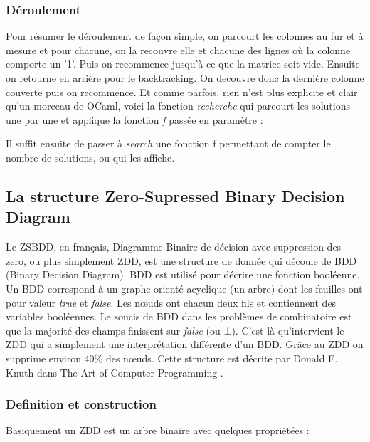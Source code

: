 \documentclass[a4paper]{article}
\begin{document}
\subsubsection{Déroulement}

Pour résumer le déroulement de façon simple, on parcourt les colonnes au fur et
à mesure et pour chacune, on la recouvre elle et chacune 
des lignes 
où la colonne comporte un '1'. Puis on recommence jusqu'à ce que la matrice 
soit vide. Ensuite on retourne en arrière pour le backtracking. On decouvre 
donc la dernière colonne couverte puis on recommence. Et comme parfois, rien n'est plus explicite et clair qu'un morceau de OCaml, 
voici la fonction \emph{recherche} qui parcourt les solutions une par une et 
applique la fonction \emph{f} passée en paramètre :




Il suffit ensuite de passer à \emph{search} une fonction f permettant de
compter le nombre de solutions, ou qui les affiche.

\subsection{La structure Zero-Supressed Binary Decision Diagram}



Le ZSBDD, en français, Diagramme Binaire de décision avec suppression des zero, 
ou plus simplement ZDD, est une structure de donnée qui découle de BDD (Binary 
Decision Diagram). BDD est utilisé pour décrire une fonction booléenne. Un
BDD correspond à un graphe orienté acyclique (un arbre) dont les feuilles ont 
pour valeur
\emph{true} et \emph{false}. Les n\oe uds ont chacun deux fils et contiennent 
des variables booléennes. Le soucis de BDD dans les problèmes de combinatoire 
est que la majorité des 
champs finissent sur \emph{false} (ou $\bot$). C'est là qu'intervient le ZDD 
qui a simplement une interprétation différente d'un BDD. Grâce au ZDD on 
supprime environ 40\% des n\oe uds.
Cette structure est décrite par Donald E. Knuth dans 
The Art of Computer Programming \cite[p.249]{taocp4a}.

\subsubsection{Definition et construction}



Basiquement un ZDD est un arbre binaire avec quelques propriétées : 
\end{document}
